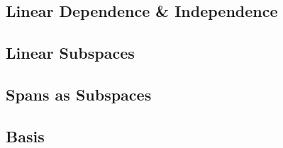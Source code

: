\subsection{Linear Dependence \& Independence}\label{concept1.7}

\subsection{Linear Subspaces}\label{concept1.8}

\subsection{Spans as Subspaces}\label{concept1.9}

\subsection{Basis}\label{concept1.10}


